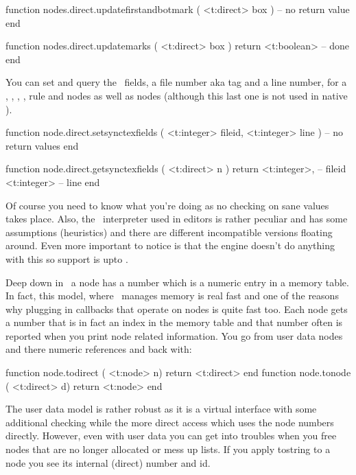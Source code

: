 function nodes.direct.updatefirstandbotmark ( <t:direct> box )
    -- no return value
end

function nodes.direct.updatemarks ( <t:direct> box )
    return <t:boolean> -- done
end
\stoptyping

\stopsubsection

\startsubsection[title={\SYNCTEX}]

You can set and query the \SYNCTEX\ fields, a file number aka tag and a line
number, for a , , , , \type
{rule} and  nodes as well as  nodes (although this last
one is not used in native \SYNCTEX).

\starttyping[option=LUA]
function node.direct.setsynctexfields ( <t:integer> fileid, <t:integer> line )
    -- no return values
end

function node.direct.getsynctexfields ( <t:direct> n )
    return
        <t:integer>, -- fileid
        <t:integer>  -- line
end
\stoptyping

Of course you need to know what you're doing as no checking on sane values takes
place. Also, the \SYNCTEX\ interpreter used in editors is rather peculiar and has
some assumptions (heuristics) and there are different incompatible versions
floating around. Even more important to notice is that the engine doesn't do
anything with this so support is upto \LUA.

\stopsubsection

\startsubsection[title={Two access models}]

Deep down in \TEX\ a node has a number which is a numeric entry in a memory
table. In fact, this model, where \TEX\ manages memory is real fast and one of
the reasons why plugging in callbacks that operate on nodes is quite fast too.
Each node gets a number that is in fact an index in the memory table and that
number often is reported when you print node related information. You go from
user data nodes and there numeric references and back with:

\starttyping[option=LUA]
function node.todirect ( <t:node>   n) return <t:direct> end
function node.tonode   ( <t:direct> d) return <t:node>   end
\stoptyping

The user data model is rather robust as it is a virtual interface with some
additional checking while the more direct access which uses the node numbers
directly. However, even with user data you can get into troubles when you free
nodes that are no longer allocated or mess up lists. If you apply \type
{tostring} to a node you see its internal (direct) number and id.

